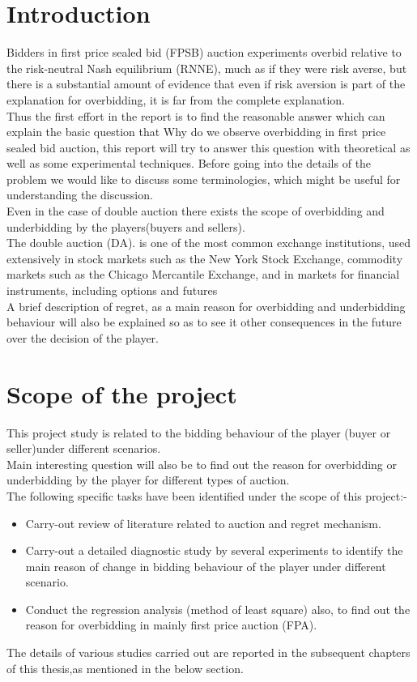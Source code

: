 \documentclass[10pt,a4paper,oneside]{report}
\begin{document}
\section{Introduction}
Bidders in first price sealed bid (FPSB) auction experiments overbid relative to the risk-neutral Nash equilibrium (RNNE), much as if they were risk averse, but there is a substantial amount of evidence that even if risk aversion is part of the explanation for overbidding, it is far from the complete explanation.\\
\noindent Thus the first effort in the  report is to find the reasonable answer which can explain the basic question that Why do we observe overbidding in first price sealed bid auction, this report will try to answer this question with theoretical as well as some experimental techniques. Before going into the details of the problem we would like to discuss some terminologies, which might be useful for understanding the discussion.\\
\noindent Even in the case of double auction there exists the scope of overbidding and underbidding by the players(buyers and sellers).\\
\noindent The double auction (DA). is one of the most common exchange institutions, used extensively in stock markets such as the New York Stock Exchange, commodity markets such as the Chicago Mercantile Exchange, and in markets for financial instruments, including options and futures\\
\noindent A brief description of regret, as a main reason for overbidding and underbidding behaviour will also be explained so as to see it other consequences in the future over the decision of the player.

\section{Scope of the project}
This project study is related to the bidding behaviour of the player (buyer or seller)under different scenarios.\\
\noindent Main interesting question will also be to find out the reason for overbidding or underbidding by the player for different types of auction.\\
\noindent The following specific tasks have been identified under the scope of this project:-
\begin{itemize}
\item Carry-out review of literature related to auction and regret mechanism.
\item Carry-out a detailed diagnostic study by several experiments to identify the main reason of change in bidding behaviour of the player under different scenario.
\item Conduct the regression analysis (method of least square) also, to find out the reason for overbidding in mainly first price auction (FPA).
\end{itemize}
\noindent The details of various studies carried out are reported in the subsequent chapters of this thesis,as mentioned in the below section.
\end{document}
